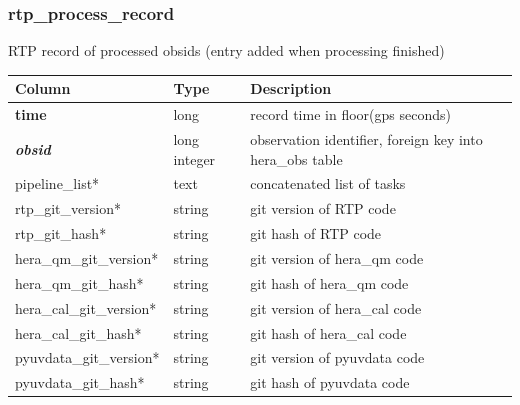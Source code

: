 \documentclass{article}
\begin{document}
{\subsubsection{rtp\_process\_record}
RTP record of processed obsids (entry added when processing finished)
\begin{center}
 \begin{tabular}{| p{4cm} | p{2cm} | p{10cm} |}
\hline
 {\bf Column} & {\bf Type}  & {\bf Description} \\ [0.5ex]  \hline\hline
\textbf{time} & long & record time in floor(gps seconds)\\ \hline
\textit{\textbf{obsid}} & long integer & observation identifier, foreign key into hera\_obs table \\ \hline
pipeline\_list* & text & concatenated list of tasks  \\\hline
rtp\_git\_version* & string & git version of RTP code  \\\hline
rtp\_git\_hash* & string & git hash of RTP code  \\\hline
hera\_qm\_git\_version* & string & git version of hera\_qm code  \\\hline
hera\_qm\_git\_hash* & string & git hash of hera\_qm code  \\\hline
hera\_cal\_git\_version* & string & git version of hera\_cal code  \\\hline
hera\_cal\_git\_hash* & string & git hash of hera\_cal code  \\\hline
pyuvdata\_git\_version* & string & git version of pyuvdata code  \\\hline
pyuvdata\_git\_hash* & string & git hash of pyuvdata code  \\\hline
\end{tabular}
\end{center}

}
\end{document}
